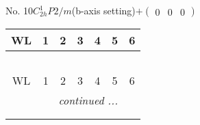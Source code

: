 \documentclass[fleqn,9pt,landscape]{jsarticle}
\begin{document}
\newpage
No. 10\quad$C_{2h}^{1}$\quad$P2/m$\quad(b-axis setting)\quad[ monoclinic ]\quad$+\begin{pmatrix} 0 & 0 & 0 \end{pmatrix}$
\begin{center}
\renewcommand{\arraystretch}{1.2}
\begin{longtable}{ccccccc}
 \hline \hline
WL & 1 & 2 & 3 & 4 & 5 & 6 \\ \hline \endfirsthead

\multicolumn{6}{l}{\tablename\ \thetable{}} \\
 \hline \hline
WL & 1 & 2 & 3 & 4 & 5 & 6 \\ \hline \endhead

 \hline \hline
\multicolumn{6}{r}{\footnotesize\it continued ...} \\ \endfoot

 \hline \hline
\multicolumn{6}{r}{} \\ \endlastfoot


\end{longtable}
\end{center}
\end{document}
